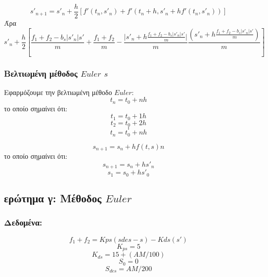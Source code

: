\documentclass[a4paper]{article}
\begin{document}
        \hrulefill{}
        \[s'_{n+1}=s'_n+\frac{h}{2}{[f'(t_n, s'_n)+f'(t_n+h, s'_n+hf'(t_n,s'_n))]}\]
        Άρα
        \[s'_n+\frac{h}{2}{[\frac{f_1+f_2-b_s\rvert s'_n \lvert s'}{m}+\frac{f_1+f_2}{m}-\frac{\lvert s'_n+h\frac{f_1+f_2-b_s\rvert s'_n \lvert s'}{m}\rvert}{m}\frac{(s'_n+h\frac{f_1+f_2-b_s\rvert s'_n \lvert s'}{m})}{m}]}\]
        
        \subsubsection*{Bελτιωμένη μέθοδος $Euler$ $s$}
        Εφαρμόζουμε την βελτιωμένη μέθοδο $Euler$:
        \[t_n=t_0+nh\]
        το οποίο σημαίνει ότι:
        \[t_1=t_0+1h\]
        \[t_2=t_0+2h\]
        \[.\]
        \[.\]
        \[.\]
        \[t_n=t_0+nh\]

        \hrulefill{}

        \[s_{n+1}=s_n+hf(t,s)n\]
        το οποίο σημαίνει ότι:
        \[s_{n+1}=s_n+hs'_n\]
        \[s_1=s_0+hs'_0\]
        \subsection{ερώτημα γ: Μέθοδος $Euler$}

        \subsubsection{Δεδομένα:}
        \begin{equation}
            f_1 + f_2 = Kps (sdes - s) - Kds (s')
        \end{equation}
        \begin{equation}
            K_{ps} = 5
        \end{equation}
        \begin{equation}
            K_{ds} = 15 + (AM/ 100)
        \end{equation}
        \begin{equation}
            S_0 =0
        \end{equation}
        \begin{equation}
            S_{des} = AM / 200
        \end{equation}
            
        
\end{document}
